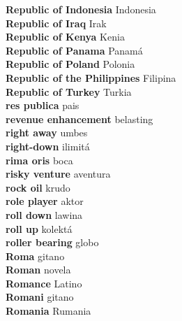 \textbf{ Republic of Indonesia  } Indonesia \\
\textbf{ Republic of Iraq  } Irak \\
\textbf{ Republic of Kenya  } Kenia \\
\textbf{ Republic of Panama  } Panamá \\
\textbf{ Republic of Poland  } Polonia \\
\textbf{ Republic of the Philippines  } Filipina \\
\textbf{ Republic of Turkey  } Turkia \\
\textbf{ res publica  } pais \\
\textbf{ revenue enhancement  } belasting \\
\textbf{ right away  } umbes \\
\textbf{ right-down  } ilimitá \\
\textbf{ rima oris  } boca \\
\textbf{ risky venture  } aventura \\
\textbf{ rock oil  } krudo \\
\textbf{ role player  } aktor \\
\textbf{ roll down  } lawina \\
\textbf{ roll up  } kolektá \\
\textbf{ roller bearing  } globo \\
\textbf{ Roma  } gitano \\
\textbf{ Roman  } novela \\
\textbf{ Romance  } Latino \\
\textbf{ Romani  } gitano \\
\textbf{ Romania  } Rumania \\
